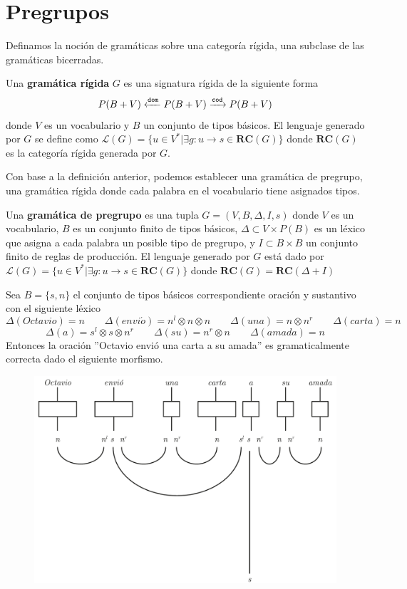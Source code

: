\documentclass[../main.tex]{subfiles}
\begin{document}
    \section{Pregrupos}

    Definamos la noción de gramáticas sobre una categoría rígida, una subclase de las gramáticas bicerradas. 
    \begin{dfn}
        Una \textbf{gramática rígida} $G$ es una signatura rígida de la siguiente forma
        $$P(B+V) \xleftarrow{\tt{dom}} P(B+V) \xrightarrow{\tt{cod}} P(B+V)$$
        donde $V$ es un vocabulario y $B$ un conjunto de tipos básicos. El lenguaje generado por $G$ se define como
        $\mathcal{L}(G) = \{ u \in V^* | \exists g :u \to s \in \textbf{RC}(G) \}$
        donde $\textbf{RC}(G)$ es la categoría rígida generada por $G$.
    \end{dfn}
    Con base a la definición anterior, podemos establecer una gramática de pregrupo, una gramática rígida donde cada palabra en el vocabulario tiene asignados tipos. 
    \begin{dfn}
        Una \textbf{gramática de pregrupo} es una tupla $G=(V,B, \Delta, I,s)$ donde $V$ es un vocabulario, $B$ es un conjunto finito de tipos básicos, $\Delta \subset V \times P(B)$ es un léxico que asigna a cada palabra un posible tipo de pregrupo, y $I \subset B \times B$  un conjunto finito de reglas de producción. El lenguaje generado por $G$ está dado por
        $\mathcal{L}(G) = \{ u \in V^* | \exists g :u \to s \in \textbf{RC}(G) \}$
        donde $\textbf{RC}(G) = \textbf{RC}(\Delta+I)$
    \end{dfn}
    \begin{ej}
        Sea $B = \{ s, n \} $ el conjunto de tipos básicos correspondiente oración y sustantivo con el siguiente léxico 
        $$\Delta(Octavio)=n \qquad \Delta(envi\acute{o}) =n^l \otimes n \otimes n \qquad \Delta(una)=n \otimes n^r \qquad \Delta(carta)=n$$
        $$\Delta (a)=s^l \otimes s \otimes n^r \qquad \Delta(su)=n^r \otimes n \qquad \Delta(amada)=n$$
        Entonces la oración ''Octavio envió una carta a su amada'' es gramaticalmente correcta dado el siguiente morfismo.
        \begin{figure}[H]		
            \includegraphics[scale=.45]{TeX/diagrama/pregroup.pdf}
			\centering
	\end{figure}        
    \end{ej}
\end{document}
